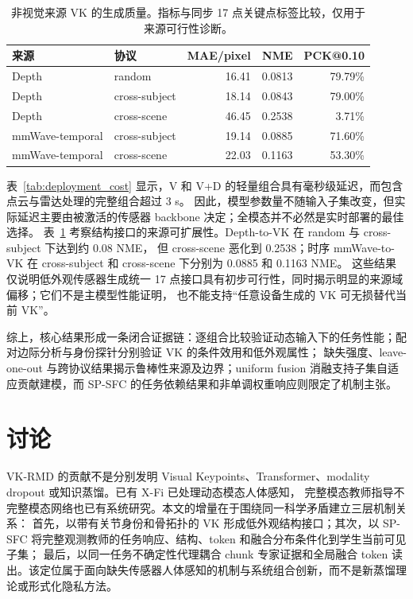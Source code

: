 \documentclass[journal]{IEEEtran}
\newcommand{\parahead}[1]{\vspace{0.4em}\noindent{\textbf{#1}}}
\begin{document}
\begin{table}[H]
\centering
\caption{非视觉来源 VK 的生成质量。指标与同步 17 点关键点标签比较，仅用于来源可行性诊断。}
\label{tab:generated_vk}
\scriptsize
\setlength{\tabcolsep}{2.4pt}
\begin{tabular}{llrrr}
\toprule
来源 & 协议 & MAE/pixel & NME & PCK@0.10 \\
\midrule
Depth & random & 16.41 & 0.0813 & 79.79\% \\
Depth & cross-subject & 18.14 & 0.0843 & 79.00\% \\
Depth & cross-scene & 46.45 & 0.2538 & 3.71\% \\
mmWave-temporal & cross-subject & 19.14 & 0.0885 & 71.60\% \\
mmWave-temporal & cross-scene & 22.03 & 0.1163 & 53.30\% \\
\bottomrule
\end{tabular}
\end{table}

表~\ref{tab:deployment_cost} 显示，V 和 V+D 的轻量组合具有毫秒级延迟，而包含点云与雷达处理的完整组合超过 3 s。
因此，模型参数量不随输入子集改变，但实际延迟主要由被激活的传感器 backbone 决定；全模态并不必然是实时部署的最佳选择。
表~\ref{tab:generated_vk} 考察结构接口的来源可扩展性。Depth-to-VK 在 random 与 cross-subject 下达到约 0.08 NME，
但 cross-scene 恶化到 0.2538；时序 mmWave-to-VK 在 cross-subject 和 cross-scene 下分别为 0.0885 和 0.1163 NME。
这些结果仅说明低外观传感器生成统一 17 点接口具有初步可行性，同时揭示明显的来源域偏移；它们不是主模型性能证明，
也不能支持“任意设备生成的 VK 可无损替代当前 VK”。

综上，核心结果形成一条闭合证据链：逐组合比较验证动态输入下的任务性能；配对边际分析与身份探针分别验证 VK 的条件效用和低外观属性；
缺失强度、leave-one-out 与跨协议结果揭示鲁棒性来源及边界；uniform fusion 消融支持子集自适应贡献建模，而 SP-SFC 的任务依赖结果和非单调权重响应则限定了机制主张。

\section{讨论}

\parahead{创新边界。}
VK-RMD 的贡献不是分别发明 Visual Keypoints、Transformer、modality dropout 或知识蒸馏。已有 X-Fi 已处理动态模态人体感知，
完整模态教师指导不完整模态网络也已有系统研究\cite{xfi,incompleteKD,mmanet}。本文的增量在于围绕同一科学矛盾建立三层机制关系：
首先，以带有关节身份和骨拓扑的 VK 形成低外观结构接口；其次，以 SP-SFC 将完整观测教师的任务响应、结构、token 和融合分布条件化到学生当前可见子集；
最后，以同一任务不确定性代理耦合 chunk 专家证据和全局融合 token 读出。该定位属于面向缺失传感器人体感知的机制与系统组合创新，而不是新蒸馏理论或形式化隐私方法。
\end{document}
